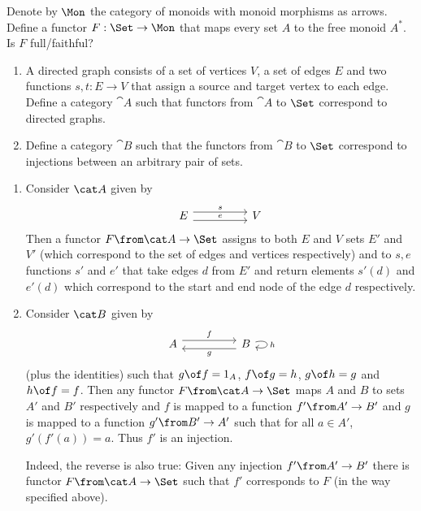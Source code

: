 \begin{exercise}
  Denote by $\Mon$ the category of monoids with monoid morphisms as arrows.
  Define a functor $F : \Set \to \Mon$ that maps every set $A$ to the free monoid $A^*$.
  Is $F$ full/faithful?
\end{exercise}

\begin{exercise}
  \begin{enumerate}
    \item A directed graph consists of a set of vertices $V$, a set of edges $E$ and two functions $s, t : E \to V$ that assign a source and target vertex to each edge.
      Define a category $\cat{A}$ such that functors from $\cat{A}$ to $\Set$ correspond to directed graphs.
    \item Define a category $\cat{B}$ such that the functors from $\cat{B}$ to $\Set$ correspond to injections between an arbitrary pair of sets.
  \end{enumerate}
\end{exercise}

\begin{answer}
  \begin{enumerate}
  \item Consider $\A$ given by
    \[
      \begin{tikzcd}[column sep=huge,row sep=huge]
        E\arrow[r,yshift=.85ex,"s"] \arrow[r,below,yshift=-.85ex,"e"]&V
      \end{tikzcd}
    \]
    Then a functor $F\from \A\to\Set$ assigns to both $E$ and $V$ sets $E'$ and $V'$ (which correspond to the set of edges and vertices respectively) and to $s,e$ functions $s'$ and $e'$ that take edges $d$ from $E'$ and return elements $s'(d)$ and $e'(d)$ which correspond to the start and end node of the edge $d$ respectively.
  \item Consider $\B$ given by
    \[
      \begin{tikzcd}[column sep=huge,row sep=huge]
        A\arrow[r,yshift=.85ex,"f"] & B\arrow[l,below,yshift=-.85ex,"g"] \arrow[loop right,"h"]
      \end{tikzcd}
    \]
    (plus the identities) such that $g\of f=1_A$, $f\of g=h$, $g\of h=g$ and $h\of f=f$. Then any functor $F\from\A\to\Set$ maps $A$ and $B$ to sets $A'$ and $B'$ respectively and $f$ is mapped to a function $f'\from A'\to B'$ and $g$ is mapped to a function $g'\from B'\to A'$ such that for all $a\in A'$, $g'(f'(a))=a$. Thus $f'$ is an injection.

    Indeed, the reverse is also true: Given any injection $f'\from A'\to B'$ there is functor $F\from \A\to\Set$ such that $f'$ corresponds to $F$ (in the way specified above).
  \end{enumerate}
\end{answer}


